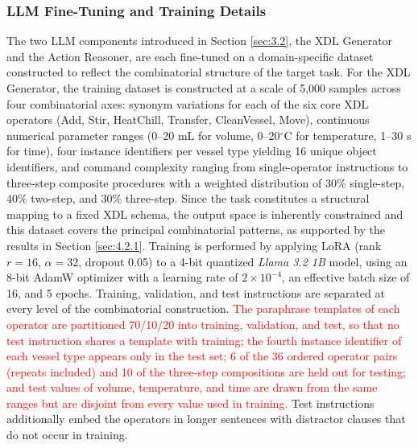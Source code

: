 \documentclass{ieeeaccess}
\newif\ifhighlight
\newcommand{\rev}[1]{\ifhighlight\hl{#1}\else#1\fi}
\newcommand{\nd}[1]{\textcolor{red}{#1}}
\begin{document}
\subsubsection{LLM Fine-Tuning and Training Details}\label{sec:4.1.3}
The two LLM components introduced in Section \ref{sec:3.2}, the XDL Generator and the Action Reasoner, are each fine-tuned on a domain-specific dataset constructed to reflect the combinatorial structure of the target task. For the XDL Generator, the training dataset is constructed at a scale of 5,000 samples across four combinatorial axes: synonym variations for each of the six core XDL operators (Add, Stir, HeatChill, Transfer, CleanVessel, Move), continuous numerical parameter ranges (0--20 mL for volume, 0--20$^\circ$C for temperature, 1--30 s for time), four instance identifiers per vessel type yielding 16 unique object identifiers, and command complexity ranging from single-operator instructions to three-step composite procedures with a weighted distribution of 30\% single-step, 40\% two-step, and 30\% three-step. Since the task constitutes a structural mapping to a fixed XDL schema, the output space is inherently constrained and this dataset covers the principal combinatorial patterns, as supported by the results in Section \ref{sec:4.2.1}. Training is performed by applying LoRA (rank $r = 16$, $\alpha = 32$, dropout 0.05) to a 4-bit quantized \textit{Llama 3.2 1B} model, using an 8-bit AdamW optimizer with a learning rate of $2 \times 10^{-4}$, an effective batch size of 16, and 5 epochs.
\rev{Training, validation, and test instructions are separated at every level of the combinatorial construction.
\nd{The paraphrase templates of each operator are partitioned 70/10/20 into training, validation, and test, so that no test instruction shares a template with training; the fourth instance identifier of each vessel type appears only in the test set; 6 of the 36 ordered operator pairs (repeats included) and 10 of the three-step compositions are held out for testing; and test values of volume, temperature, and time are drawn from the same ranges but are disjoint from every value used in training.}
Test instructions additionally embed the operators in longer sentences with distractor clauses that do not occur in training.}
\end{document}
